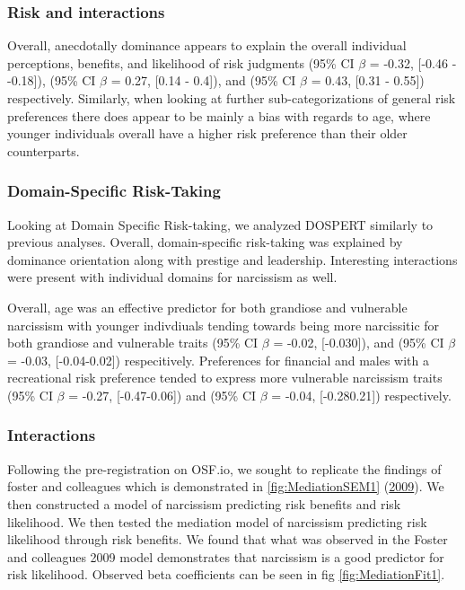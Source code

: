 \documentclass[
  donotrepeattitle,doc, 12pt, a4paper,floatsintext]{apa7}
\begin{document}
\hypertarget{risk-and-interactions}{%
\subsubsection{Risk and interactions}\label{risk-and-interactions}}

Overall, anecdotally dominance appears to explain the overall individual perceptions, benefits, and likelihood of risk judgments (95\% CI \(\beta\) = -0.32, {[}-0.46 - -0.18{]}), (95\% CI \(\beta\) = 0.27, {[}0.14 - 0.4{]}), and (95\% CI \(\beta\) = 0.43, {[}0.31 - 0.55{]}) respectively. Similarly, when looking at further sub-categorizations of general risk preferences there does appear to be mainly a bias with regards to age, where younger individuals overall have a higher risk preference than their older counterparts.

\hypertarget{domain-specific-risk-taking-1}{%
\subsubsection{Domain-Specific Risk-Taking}\label{domain-specific-risk-taking-1}}

Looking at Domain Specific Risk-taking, we analyzed DOSPERT similarly to previous analyses. Overall, domain-specific risk-taking was explained by dominance orientation along with prestige and leadership. Interesting interactions were present with individual domains for narcissism as well.

Overall, age was an effective predictor for both grandiose and vulnerable narcissism with younger indivdiuals tending towards being more narcissitic for both grandiose and vulnerable traits (95\% CI \(\beta\) = -0.02, {[}-0.030{]}), and (95\% CI \(\beta\) = -0.03, {[}-0.04-0.02{]}) respecitively. Preferences for financial and males with a recreational risk preference tended to express more vulnerable narcissism traits (95\% CI \(\beta\) = -0.27, {[}-0.47-0.06{]}) and (95\% CI \(\beta\) = -0.04, {[}-0.280.21{]}) respectively.

\hypertarget{interactions-1}{%
\subsubsection{Interactions}\label{interactions-1}}

Following the pre-registration on OSF.io, we sought to replicate the findings of foster and colleagues which is demonstrated in \ref{fig:MediationSEM1} (\protect\hyperlink{ref-foster2009}{2009}). We then constructed a model of narcissism predicting risk benefits and risk likelihood. We then tested the mediation model of narcissism predicting risk likelihood through risk benefits. We found that what was observed in the Foster and colleagues 2009 model demonstrates that narcissism is a good predictor for risk likelihood. Observed beta coefficients can be seen in fig \ref{fig:MediationFit1}.
\end{document}
